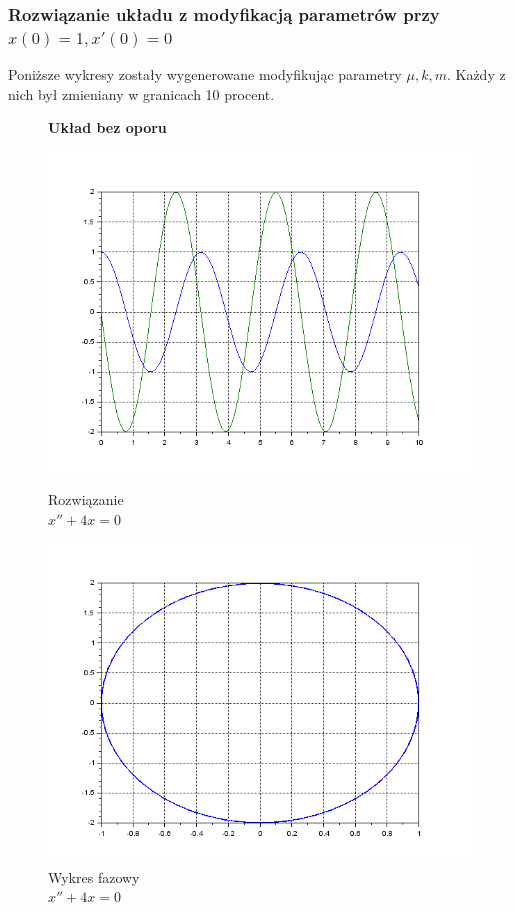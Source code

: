 \documentclass[12pt]{article}
\begin{document}
\subsubsection{Rozwiązanie układu z modyfikacją parametrów przy $x(0)=1, x'(0)=0$}

Poniższe wykresy zostały wygenerowane modyfikując parametry $\mu, k, m$. Każdy z nich był zmieniany w granicach 10 procent.

\begin{figure}[H]
  \centering
  \textbf{Układ bez oporu}\par\medskip
  \hspace{-1.6cm}
  \begin{minipage}[b]{0.49\textwidth}
    \includegraphics[scale=0.47]{./img/5-boporu-xy}
    \caption{Rozwiązanie \\ \centering$x''+4x=0$}
    \label{5-boporu-xy}
  \end{minipage}
  \hfill
  \begin{minipage}[b]{0.49\textwidth}
    \includegraphics[scale=0.47]{./img/5-boporu-phase}
    \caption{Wykres fazowy \\ \centering$x''+4x=0$}
    \label{5-boporu-phase}
  \end{minipage}
\end{figure}
\end{document}
